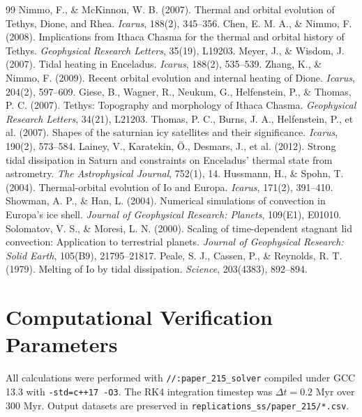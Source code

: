 \documentclass[11pt,a4paper]{article}
\begin{document}
\begin{thebibliography}{99}
 Nimmo, F., \& McKinnon, W. B. (2007). Thermal and orbital evolution of Tethys, Dione, and Rhea. \textit{Icarus}, 188(2), 345--356.
 Chen, E. M. A., \& Nimmo, F. (2008). Implications from Ithaca Chasma for the thermal and orbital history of Tethys. \textit{Geophysical Research Letters}, 35(19), L19203.
 Meyer, J., \& Wisdom, J. (2007). Tidal heating in Enceladus. \textit{Icarus}, 188(2), 535--539.
 Zhang, K., \& Nimmo, F. (2009). Recent orbital evolution and internal heating of Dione. \textit{Icarus}, 204(2), 597--609.
 Giese, B., Wagner, R., Neukum, G., Helfenstein, P., \& Thomas, P. C. (2007). Tethys: Topography and morphology of Ithaca Chasma. \textit{Geophysical Research Letters}, 34(21), L21203.
 Thomas, P. C., Burns, J. A., Helfenstein, P., et al. (2007). Shapes of the saturnian icy satellites and their significance. \textit{Icarus}, 190(2), 573--584.
 Lainey, V., Karatekin, {\"O}., Desmars, J., et al. (2012). Strong tidal dissipation in Saturn and constraints on Enceladus' thermal state from astrometry. \textit{The Astrophysical Journal}, 752(1), 14.
 Hussmann, H., \& Spohn, T. (2004). Thermal-orbital evolution of Io and Europa. \textit{Icarus}, 171(2), 391--410.
 Showman, A. P., \& Han, L. (2004). Numerical simulations of convection in Europa's ice shell. \textit{Journal of Geophysical Research: Planets}, 109(E1), E01010.
 Solomatov, V. S., \& Moresi, L. N. (2000). Scaling of time-dependent stagnant lid convection: Application to terrestrial planets. \textit{Journal of Geophysical Research: Solid Earth}, 105(B9), 21795--21817.
 Peale, S. J., Cassen, P., \& Reynolds, R. T. (1979). Melting of Io by tidal dissipation. \textit{Science}, 203(4383), 892--894.
\end{thebibliography}

\appendix
\section{Computational Verification Parameters}
All calculations were performed with \texttt{//:paper\_215\_solver} compiled under GCC 13.3 with \texttt{-std=c++17 -O3}. The RK4 integration timestep was $\Delta t = 0.2\text{ Myr}$ over $300\text{ Myr}$. Output datasets are preserved in \texttt{replications\_ss/paper\_215/*.csv}.
\end{document}
